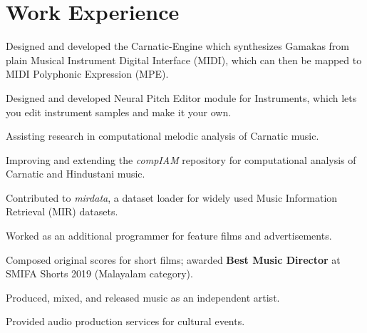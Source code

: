 \section{Work Experience}
\begin{bullets}
    \item Designed and developed the Carnatic-Engine which synthesizes Gamakas from plain Musical Instrument Digital Interface (MIDI), which can then be mapped to MIDI Polyphonic Expression (MPE).
    \item Designed and developed Neural Pitch Editor module for Instruments, which lets you edit instrument samples and make it your own.
\end{bullets}
\sectionsep

\begin{bullets}
    \item Assisting research in computational melodic analysis of Carnatic music.
    \item Improving and extending the \textit{compIAM} repository for computational analysis of Carnatic and Hindustani music.
    \item Contributed to \textit{mirdata}, a dataset loader for widely used Music Information Retrieval (MIR) datasets.
\end{bullets}
\sectionsep

\begin{bullets}
    \item Worked as an additional programmer for feature films and advertisements.
    \item Composed original scores for short films; awarded \textbf{Best Music Director} at SMIFA Shorts 2019 (Malayalam category).
    \item Produced, mixed, and released music as an independent artist.
    \item Provided audio production services for cultural events.
\end{bullets}
\sectionsep
